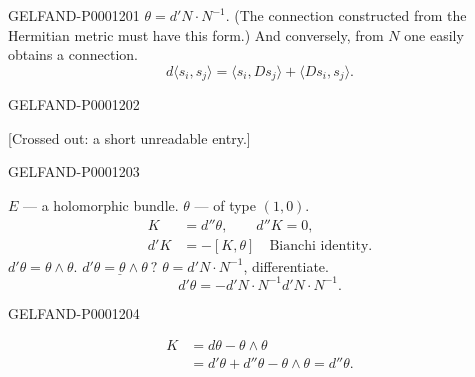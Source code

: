\begin{GelfandAdjacentEvidence}{GELFAND-P000120}{1}
$\theta=d'N\cdot N^{-1}$.
(The connection constructed from the Hermitian metric must have this form.)
And conversely, from $N$ one easily obtains a connection.
\begin{equation*}d\langle s_i,s_j\rangle=\langle s_i,Ds_j\rangle+\langle Ds_i,s_j\rangle.\end{equation*}
\noindent\underline{}
\end{GelfandAdjacentEvidence}
\begin{GelfandAdjacentEvidence}{GELFAND-P000120}{2}

[Crossed out: a short unreadable entry.]
\end{GelfandAdjacentEvidence}
\begin{GelfandAdjacentEvidence}{GELFAND-P000120}{3}

$E$ — a holomorphic bundle. $\theta$ — of type $(1,0)$.
\begin{align*}
K&=d''\theta,\qquad d''K=0,\\
d'K&=-[K,\theta]\quad\text{Bianchi identity.}
\end{align*}
$d'\theta=\theta\wedge\theta$.
$\underline{d'\theta=\theta\wedge\theta\ ?}$
$\theta=d'N\cdot N^{-1}$, differentiate.
\begin{equation*}d'\theta=-d'N\cdot N^{-1}d'N\cdot N^{-1}.\end{equation*}
\end{GelfandAdjacentEvidence}
\begin{GelfandAdjacentEvidence}{GELFAND-P000120}{4}

\begin{equation*}
\begin{aligned}
K&=d\theta-\theta\wedge\theta\\
 &=d'\theta+d''\theta-\theta\wedge\theta=d''\theta.
\end{aligned}
\end{equation*}
\end{GelfandAdjacentEvidence}

